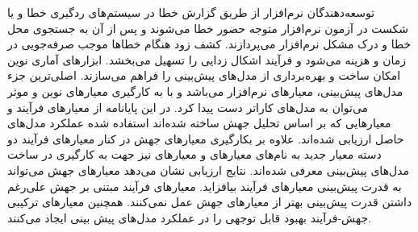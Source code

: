 
 توسعه‌دهندگان نرم‌افزار از طریق گزارش خطا در سیستم­‌های ردگیری خطا و یا شکست در آزمون نرم‌‌افزار متوجه حضور خطا می‌شوند و پس از آن به جستجوی محل خطا و درک مشکل  نرم‌‌افزار می‌‌پردازند. کشف زود هنگام خطاها موجب صرفه‌‌جویی در زمان و هزینه می­‌شود و فرآیند اشکال زدایی را تسهیل می‌­بخشد. ابزارهای آماری نوین امکان ساخت و بهره‌‌برداری از مدل‌های پیش‌بینی را فراهم می‌سازند. اصلی‌ترین جزء مدل‌های پیش‌بینی، معیارهای نرم‌افزار می‌باشد و با به کارگیری معیارهای نوین و موثر می‌توان به مدل‌های کاراتر دست پیدا کرد. در این پایانامه از معیارهای فرآیند و معیارهایی که بر اساس تحلیل جهش ساخته شده‌اند استفاده شده عملکرد مدل‌های حاصل ارزیابی شده‌اند. علاوه بر بکارگیری معیارهای جهش در کنار معیارهای فرآیند دو دسته معیار جدید به نام‌های معیارهای  و معیارهای  نیز جهت به کارگیری در ساخت مدل‌های پیش‌بینی معرفی شده‌اند. نتایج ارزیابی نشان می‌دهد معیارهای جهش می‌تواند به قدرت پیش‌بینی معیارهای فرآیند بیافزاید. معیارهای فرآیند مبتنی بر جهش علی‌رغم داشتن قدرت پیش‌بینی بهتر از معیارهای جهش عمل نمی‌کنند. همچنین معیارهای ترکیبی جهش-فرآیند بهبود قابل توجهی را در عملکرد مدل‌های پیش بینی ایجاد می‌کنند. 
